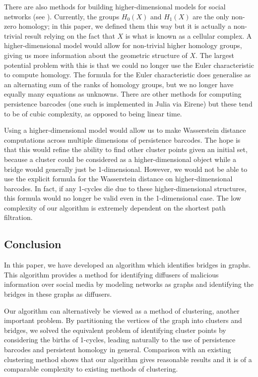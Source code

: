 \documentclass[12pt,a4paper]{amsart}
\numberwithin{equation}{section}
\theoremstyle{plain}
\theoremstyle{definition}
\begin{document}
There are also methods for building higher-dimensional models for social networks (see \cite{highdim}). Currently, the groups $H_0(X)$ and $H_1(X)$ are the only non-zero homology; in this paper, we defined them this way but it is actually a non-trivial result relying on the fact that $X$ is what is known as a cellular complex. A higher-dimensional model would allow for non-trivial higher homology groups, giving us more information about the geometric structure of $X$. The largest potential problem with this is that we could no longer use the Euler characteristic to compute homology. The formula for the Euler characteristic does generalise as an alternating sum of the ranks of homology groups, but we no longer have equally many equations as unknowns. There are other methods for computing persistence barcodes (one such is implemented in Julia via Eirene) but these tend to be of cubic complexity, as opposed to being linear time.  

Using a higher-dimensional model would allow us to make Wasserstein distance computations across multiple dimensions of persistence barcodes. The hope is that this would refine the ability to find other cluster points given an initial set, because a cluster could be considered as a higher-dimensional object while a bridge would generally just be 1-dimensional. However, we would not be able to use the explicit formula for the Wasserstein distance on higher-dimensional barcodes. In fact, if any 1-cycles die due to these higher-dimensional structures, this formula would no longer be valid even in the 1-dimensional case. The low complexity of our algorithm is extremely dependent on the shortest path filtration.

\subsection*{Conclusion}

In this paper, we have developed an algorithm which identifies bridges in graphs. This algorithm provides a method for identifying diffusers of malicious information over social media by modeling networks as graphs and identifying the bridges in these graphs as diffusers.

Our algorithm can alternatively be viewed as a method of clustering, another important problem. By partitioning the vertices of the graph into clusters and bridges, we solved the equivalent problem of identifying cluster points by considering the births of 1-cycles, leading naturally to the use of persistence barcodes and persistent homology in general. Comparison with an existing clustering method shows that our algorithm gives reasonable results and it is of a comparable complexity to existing methods of clustering. 
\end{document}
